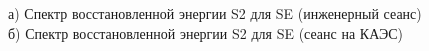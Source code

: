 \begin{figure}[H]
  \begin{minipage}[ht]{0.49\linewidth}
  \end{minipage}
  \hfill
  \begin{minipage}[ht]{0.49\linewidth}
  \end{minipage}
  \caption[спектры восстановленной энергии S2 для SE-данных]{а) Спектр восстановленной энергии S2 для SE (инженерный сеанс) б) Спектр восстановленной энергии S2 для SE (сеанс на КАЭС)}
  \label{img:SEfit}  
\end{figure}

